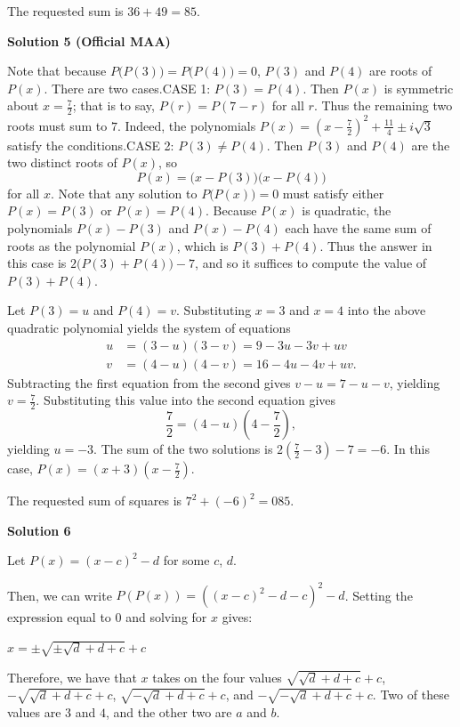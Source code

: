 \begin{enumerate}
 
The requested sum is $36 + 49 =\boxed{85}.$




\textbf{Solution 5 (Official MAA)}

Note that because $P\big(P(3)\big)=P\big(P(4)\big)= 0$, $P(3)$ and $P(4)$ are roots of $P(x)$. There are two cases.CASE 1: $P(3) = P(4)$. Then $P(x)$ is symmetric about $x=\frac72$; that is to say, $P(r) = P(7-r)$ for all $r$. Thus the remaining two roots must sum to $7$. Indeed, the polynomials $P(x) = \left(x-\frac72\right)^2 + \frac{11}4 \pm i\sqrt3$ satisfy the conditions.CASE 2: $P(3)\neq P(4)$. Then $P(3)$ and $P(4)$ are the two distinct roots of $P(x)$, so
 \[P(x) = \big(x-P(3)\big)\big(x-P(4)\big)\]for all $x$. Note that any solution to $P\big(P(x)\big) = 0$ must satisfy either $P(x) = P(3)$ or $P(x) = P(4)$. Because $P(x)$ is quadratic, the polynomials $P(x) - P(3)$ and $P(x) - P(4)$ each have the same sum of roots as the polynomial $P(x)$, which is $P(3) + P(4)$. Thus the answer in this case is $2\big(P(3) + P(4)\big)-7$, and so it suffices to compute the value of $P(3)+P(4)$.

 Let $P(3)=u$ and $P(4) = v$. Substituting $x=3$ and $x=4$ into the above quadratic polynomial yields the system of equations
 \begin{align*} u &= (3-u)(3-v) = 9 - 3u - 3v + uv\\ v &= (4-u)(4-v) = 16 - 4u - 4v + uv. \end{align*}
Subtracting the first equation from the second gives $v - u = 7 - u - v$, yielding $v = \frac72.$ Substituting this value into the second equation gives
 \[\dfrac72 = \left(4 - u\right)\left(4 - \dfrac72\right),\]yielding $u = -3.$ The sum of the two solutions is $2\left(\frac72-3\right)-7 = -6$. In this case, $P(x)= (x+3)\left(x-\frac72\right)$.

 The requested sum of squares is $7^2+(-6)^2 = \boxed{085}$.

 



\textbf{Solution 6}

Let $P(x) = (x-c)^2 - d$ for some $c$, $d$.

 Then, we can write $P(P(x)) = ((x-c)^2 - d - c)^2 - d$. Setting the expression equal to $0$ and solving for $x$ gives:

 $x = \pm \sqrt{ \pm \sqrt{d} + d + c} + c$

 Therefore, we have that $x$ takes on the four values $\sqrt{\sqrt{d} + d + c} + c$, $-\sqrt{\sqrt{d} + d + c} + c$, $\sqrt{-\sqrt{d} + d + c} + c$, and $-\sqrt{-\sqrt{d} + d + c} + c$. Two of these values are $3$ and $4$, and the other two are $a$ and $b$.


\end{enumerate}
